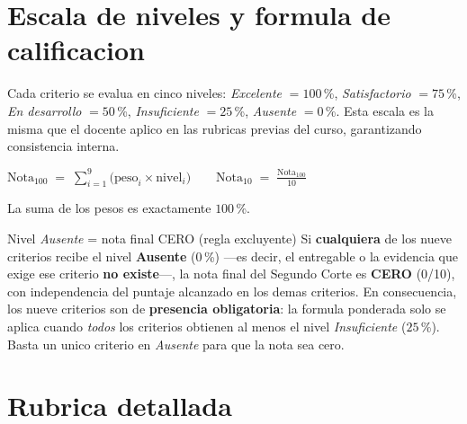 \documentclass[11pt,a4paper]{article}
\begin{document}
\section{Escala de niveles y formula de calificacion}

Cada criterio se evalua en cinco niveles: \emph{Excelente} $= 100$\,\%, \emph{Satisfactorio} $= 75$\,\%, \emph{En desarrollo} $= 50$\,\%, \emph{Insuficiente} $= 25$\,\%, \emph{Ausente} $= 0$\,\%. Esta escala es la misma que el docente aplico en las rubricas previas del curso, garantizando consistencia interna.

\begin{center}
	$\displaystyle \text{Nota}_{100} \;=\; \sum_{i=1}^{9} \bigl(\text{peso}_{i} \times \text{nivel}_{i}\bigr) \qquad \text{Nota}_{10} \;=\; \frac{\text{Nota}_{100}}{10}$
\end{center}

La suma de los pesos es exactamente $100$\,\%.

\begin{cajacritica}{Nivel \emph{Ausente} = nota final CERO (regla excluyente)}
	Si \textbf{cualquiera} de los nueve criterios recibe el nivel \textbf{Ausente} ($0$\,\%) ---es decir, el entregable o la evidencia que exige ese criterio \textbf{no existe}---, la nota final del Segundo Corte es \textbf{CERO} (0/10), con independencia del puntaje alcanzado en los demas criterios. En consecuencia, los nueve criterios son de \textbf{presencia obligatoria}: la formula ponderada solo se aplica cuando \emph{todos} los criterios obtienen al menos el nivel \emph{Insuficiente} ($25$\,\%). Basta un unico criterio en \emph{Ausente} para que la nota sea cero.
\end{cajacritica}

\section{Rubrica detallada}
\end{document}
